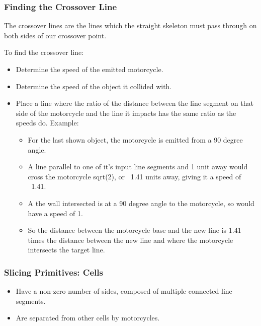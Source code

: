 \documentclass[hyperref={pdfpagemode=FullScreen},aspectratio=169]{beamer}
\begin{document}
\begin{frame}
  \frametitle{Finding the Crossover Line}
  The crossover lines are the lines which the straight skeleton must pass through on both sides of our crossover point.\par
  To find the crossover line:
  \begin{itemize}
  \item Determine the speed of the emitted motorcycle.
  \item Determine the speed of the object it collided with.
  \item Place a line where the ratio of the distance between the line segment on that side of the motorcycle and the line it impacts has the same ratio as the speeds do.
  Example:
    \begin{itemize}
    \item For the last shown object, the motorcycle is emitted from a 90 degree angle.
    \item A line parallel to one of it's input line segments and 1 unit away would cross the motorcycle sqrt(2), or ~1.41 units away, giving it a speed of ~1.41.
    \item A the wall intersected is at a 90 degree angle to the motorcycle, so would have a speed of 1.
    \item So the distance between the motorcycle base and the new line is 1.41 times the distance between the new line and where the motorcycle intersects the target line.
    \end{itemize}
  \end{itemize}
\end{frame}

\begin{frame}
  \frametitle{Slicing Primitives: Cells}
  \begin{itemize}
  \item Have a non-zero number of sides, composed of multiple connected line segments.
  \item Are separated from other cells by motorcycles.
  \end{itemize}
\end{frame}
\end{document}
